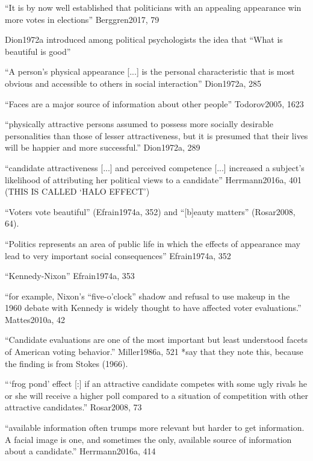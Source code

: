 
``It is by now well established that politicians with an appealing appearance win more votes in elections'' Berggren2017, 79

Dion1972a introduced among political psychologists the idea that ``What is beautiful is good''

``A person's physical appearance [...] is the personal characteristic that is most obvious and accessible to others in social interaction'' Dion1972a, 285

``Faces are a major source of information about other people'' Todorov2005, 1623

``physically attractive persons assumed to possess more socially desirable personalities than those of lesser attractiveness, but it is presumed that their lives will be happier and more successful.'' Dion1972a, 289

``candidate attractiveness [...] and perceived competence [...] increased a subject's likelihood of attributing her political views to a candidate'' Herrmann2016a, 401 (THIS IS CALLED `HALO EFFECT')

``Voters vote beautiful'' (Efrain1974a, 352) and ``[b]eauty matters'' (Rosar2008, 64).

``Politics represents an area of public life in which the effects of appearance may lead to very important social consequences'' Efrain1974a, 352


		``Kennedy-Nixon'' Efrain1974a, 353

		``for example, Nixon’s “five-o’clock” shadow and refusal to use makeup in the 1960 debate with Kennedy is widely thought to have affected voter evaluations.'' Mattes2010a, 42

``Candidate evaluations are one of the most important but least understood facets of American voting behavior.'' Miller1986a, 521 *say that they note this, because the finding is from Stokes (1966).

``‘frog pond’ effect [:] if an attractive candidate competes with some ugly rivals he or she will receive a higher poll compared to a situation of competition with other attractive candidates.'' Rosar2008, 73


``available information often trumps more relevant but harder to get information. A facial image is one, and sometimes the only, available source of information about a candidate.'' Herrmann2016a, 414

